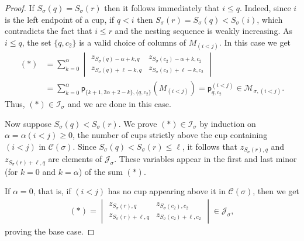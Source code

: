 \documentclass[11pt]{amsart}
\theoremstyle{remark}
\theoremstyle{remark}
\theoremstyle{definition}
\theoremstyle{definition}
\theoremstyle{definition}
\numberwithin{equation}{section}
\newcommand{\gs}{\sigma}
\newcommand{\cc}{\mathcal{C}}
\newcommand{\ci}{\mathcal{I}}
\newcommand{\cj}{\mathcal{J}}
\newcommand{\cm}{\mathcal{M}}
\newcommand{\al}{\alpha}
\newcommand{\pl}{\mathsf{p}}
\newcommand{\cupsigma}{\cc(\gs)}
\begin{document}
\begin{proof}
If $S_\gs(q)=S_{\gs}(r)$ then it follows immediately that $i\leq q$. Indeed, since $i$ is the left endpoint of a cup, if $q<i$ then $S_\gs (r) = S_\gs(q)<S_\gs(i)$, which contradicts the fact that $i\leq r$ and the nesting sequence is weakly increasing.  As $i\leq q$, the set $\{q ,c_2\}$ is a valid choice of columns of $M_{(i<j)}$. In this case we get
\begin{align*}
(*)&=\sum_{k=0}^{\al}\begin{vmatrix}
          z_{S_\sigma(q)-\al+k, q}&z_{S_\sigma(c_2)-\al+k, c_2}\\
    z_{S_\gs(q)+\ell-k, q} &  z_{S_\gs(c_2)+\ell-k, c_2}   
        \end{vmatrix}\\
&=\sum_{k=0}^{\al} \pl_{\{k+1, 2 \al +2-k\},\{q,c_2\}}(M_{(i<j)})=\pl_{q,c_2}^{(i<j)}\in\cm_{\gs,(i<j)}.
\end{align*}
Thus, $(*)\in \ci_\gs$ and we are done in this case.


Now suppose $S_\gs(q)<S_{\gs}(r)$. We prove $(*)\in \ci_\gs$ by induction on $\al = \al(i<j)\geq 0$, the number of cups strictly above the cup containing $(i<j)$ in $\cupsigma$. Since $S_\gs(q)<S_\gs(r) \leq \ell$, it follows that $z_{S_\gs(r), q}$ and $z_{S_{\gs}(r)+\ell, q}$ are elements of $\cj_\gs$. These variables appear in the first and last minor (for $k=0$ and $k=\al$) of the sum $(*)$.  

If $\alpha=0$, that is, if $(i<j)$ has no cup appearing above it in $\cupsigma$, then we get 
\begin{align*}
(*) = \begin{vmatrix} z_{S_\gs(r),q} & z_{S_\gs(c_2),c_2} \\ z_{S_\gs(r)+\ell, q} & z_{S_\gs(c_2) + \ell , c_2} \end{vmatrix}  \in \cj_\sigma,
\end{align*}
proving the base case.


\end{proof}
\end{document}
